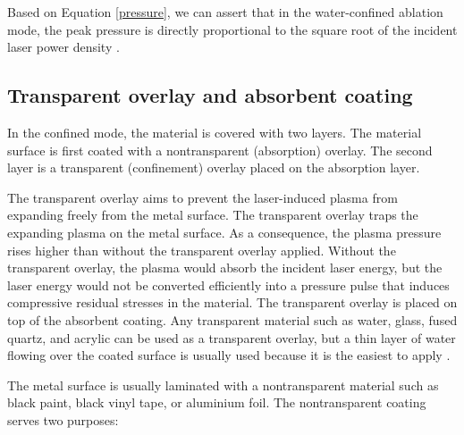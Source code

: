 Based on Equation \ref{pressure}, we can assert that in the water-confined ablation mode, the peak pressure is directly proportional to the square root of the incident laser power density \cite{fabbro_peyre_berthe_scherpereel_1998}.

\subsection{Transparent overlay and absorbent coating}

In the confined mode, the material is covered with two layers. The material surface is first coated with a nontransparent (absorption) overlay. The second layer is a transparent (confinement) overlay placed on the absorption layer.

The transparent overlay aims to prevent the laser-induced plasma from expanding freely from the metal surface.  The transparent overlay traps the expanding plasma on the metal surface. As a consequence, the plasma pressure rises higher than without the transparent overlay applied. Without the transparent overlay, the plasma would absorb the incident laser energy, but the laser energy would not be converted efficiently into a pressure pulse that induces compressive residual stresses in the material. The transparent overlay is placed on top of the absorbent coating. Any transparent material such as water, glass, fused quartz, and acrylic can be used as a transparent overlay, but a thin layer of water flowing over the coated surface is usually used because it is the easiest to apply \cite{clauer_lahrman_2001}.

The metal surface is usually laminated with a nontransparent material such as black paint, black vinyl tape, or aluminium foil. The nontransparent coating serves two purposes:

